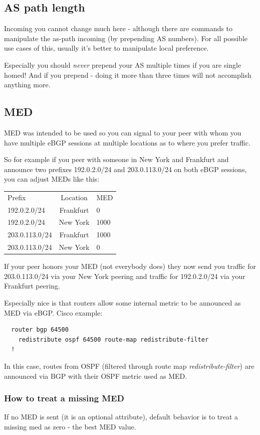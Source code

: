 \subsection{AS path length}
Incoming you cannot change much here - although there are commands to manipulate the as-path incoming (by prepending AS numbers). For all possible use cases of this, usually it's better to manipulate local preference.

Especially you should \emph{never} prepend your AS multiple times if you are single homed! And if you prepend - doing it more than three times will not accomplish anything more.

\subsection{MED}
MED was intended to be used so you can signal to your peer with whom you have multiple eBGP sessions at multiple locations as to where you prefer traffic.

So for example if you peer with someone in New York and Frankfurt and announce two prefixes 192.0.2.0/24 and 203.0.113.0/24 on both eBGP sessions, you can adjust MEDs like this:

\begin{tabu}{lcl}
  \rowfont{\bfseries} Prefix & Location & MED \\
  192.0.2.0/24 & Frankfurt & 0 \\
  192.0.2.0/24 & New York & 1000 \\
  203.0.113.0/24 & Frankfurt & 1000 \\
  203.0.113.0/24 & New York & 0 \\
\end{tabu}

If your peer honors your MED (not everybody does) they now send you traffic for 203.0.113.0/24 via your New York peering and traffic for 192.0.2.0/24 via your Frankfurt peering.

Especially nice is that routers allow some internal metric to be announced as MED via eBGP. Cisco example:
\begin{verbatim}
  router bgp 64500
    redistribute ospf 64500 route-map redistribute-filter
  !
\end{verbatim}

In this case, routes from OSPF (filtered through route map \emph{redistribute-filter}) are announced via BGP with their OSPF metric used as MED.

\subsubsection{How to treat a missing MED}
If no MED is sent (it is an optional attribute), default behavior is to treat a missing med as zero - the best MED value.

